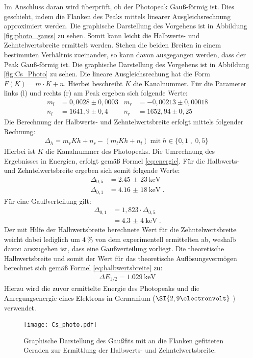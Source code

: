 \noindent Im Anschluss daran wird überprüft, ob der Photopeak Gauß-förmig ist.
Dies geschieht, indem die Flanken des Peaks mittels linearer Ausgleichsrechnung approximiert werden. Die graphische Darstellung des Vorgehens ist in Abbildung \ref{fig:photo_gauss} zu sehen.
Somit kann leicht die Halbwerts- und Zehntelwertsbreite ermittelt werden. Stehen die beiden Breiten in einem bestimmten Verhältnis zueinander, so kann davon ausgegangen werden, dass der Peak Gauß-förmig ist.
Die graphische Darstellung des Vorgehens ist in Abbildung \ref{fig:Cs_Photo} zu sehen.
Die lineare Ausgleichsrechung hat die Form $F(K) = m \cdot K + n$. Hierbei beschreibt $K$ die Kanalnummer.
Für die Parameter links (l) und rechts (r) am Peak ergeben sich folgende Werte:
\begin{align*}
    m_l &= 0,0028 \pm 0,0003 & m_r &= -0,00213 \pm 0,00018 \\
    n_l &= 1641,9 \pm 0,4    & n_r &=  1652,94 \pm 0,25
\end{align*}
Die Berechnung der Halbwerts- und Zehntelwertsbreite erfolgt mittels folgender Rechnung:
\begin{align*}
    \Delta_{h} = m_r K h + n_r - (m_l K h + n_l) \; \text{mit} \; h \in \{0,1 \; , \; 0,5\} \;
\end{align*}
Hierbei ist $K$ die Kanalnummer des Photopeaks.
Die Umrechnung des Ergebnisses in Energien, erfolgt gemäß Formel \ref{eq:energie}.
Für die Halbwerts- und Zehntelwertsbreite ergeben sich somit folgende Werte:
\begin{align*}
    \Delta_{0,5} &= \SI{2,45(23)}{\kilo \electronvolt}\\    %
    \Delta_{0,1} &= \SI{4,16(18)}{\kilo \electronvolt} \; . %
\end{align*}
Für eine Gaußverteilung gilt:
\begin{align*}
    \Delta_{0,1} &= 1,823 \cdot \Delta_{0,5} \\
                 &= \SI{4,3(4)}{\kilo \electronvolt} \; .
\end{align*}
Der mit Hilfe der Halbwertsbreite berechnete Wert für die Zehntelwertsbreite weicht
dabei lediglich um $\SI{4}{\percent}$ von dem experimentell ermittelten ab, weshalb
davon auszugehen ist, dass eine Gaußverteilung vorliegt.
Die theoretische Halbwertsbreite und somit der Wert für das theoretische Auflösungsvermögen berechnet sich gemäß Formel \ref{eq:halbwertsbreite} zu:
\FloatBarrier
\begin{align}
    \label{eq:halbwertbreite_theo}
    \Delta E_{1/2} = \SI{1,029}{\kilo \electronvolt}
\end{align}
\FloatBarrier
Hierzu wird die zuvor ermittelte Energie des Photopeaks und die
Anregungsenergie eines Elektrons in Germanium ($\SI{2,9{\electronvolt}}$ )
verwendet.
\FloatBarrier
\begin{figure}
    \centering
    \texttt{[image: Cs\_photo.pdf]}
    \caption{Graphische Darstellung des Gaußfits mit an die Flanken gefitteten Geraden zur Ermittlung der Halbwerts- und Zehntelwertsbreite.}
    \label{abb:Cs_photo}
\end{figure}
\FloatBarrier

